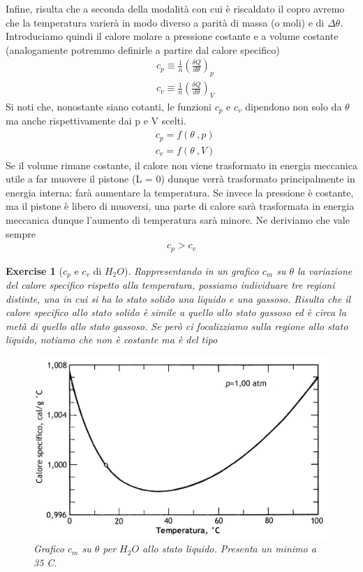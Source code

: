 \documentclass[10pt,a4paper]{article}
\newtheorem{exercise}{Exercise}
\begin{document}
Infine, risulta che a seconda della modalità con cui è riscaldato il copro avremo che la temperatura varierà in modo diverso a parità di massa (o moli) e di $\Delta \theta$. Introduciamo quindi il calore molare a pressione costante e a volume costante (analogamente potremmo definirle a partire dal calore specifico)
\begin{align*} 
	&c_p \equiv \frac{1}{n} \left(\frac{\delta Q}{d\theta}\right)_p \\
	&c_v \equiv \frac{1}{n} \left(\frac{\delta Q}{d\theta}\right)_V
\end{align*} 
Si noti che, nonostante siano cotanti, le funzioni $c_p$ e $c_v$ dipendono non solo da $\theta$ ma anche rispettivamente dai p e V scelti. 
\begin{align*} 
	&c_p = f(\theta\ , p)\\
	&c_v = f(\theta\ , V)
\end{align*} 
Se il volume rimane costante, il calore non viene trasformato in energia meccanica utile a far muovere il pistone (L = 0) dunque verrà trasformato principalmente in energia interna: farà aumentare la temperatura. Se invece la pressione è costante, ma il pistone è libero di muoversi, una parte di calore sarà trasformata in energia meccanica dunque l'aumento di temperatura sarà minore. Ne deriviamo che vale sempre
\begin{align*} 
	c_p > c_v
\end{align*}  
\begin{exercise}[$c_p$ e $c_v$ di $H_2 O$]
Rappresentando in un grafico $c_m$ su $\theta$ la variazione del calore specifico rispetto alla temperatura, possiamo individuare tre regioni distinte, una in cui si ha lo stato solido una liquido e una gassoso. Risulta che il calore specifico allo stato solido è simile a quello allo stato gassoso ed è circa la metà di quello allo stato gassoso. Se però ci focalizziamo sulla regione allo stato liquido, notiamo che non è costante ma è del tipo
\begin{figure}[h!]
	\centering
	\includegraphics[width=0.7\linewidth]{"../images/calore specifico acqua"}
	\caption{Grafico $c_m$ su $\theta$ per $H_2O$ allo stato liquido. Presenta un minimo a 35 \textdegree C.}
	\label{fig:calore-specifico-acqua}
\end{figure}
\FloatBarrier
\end{exercise}
\end{document}
